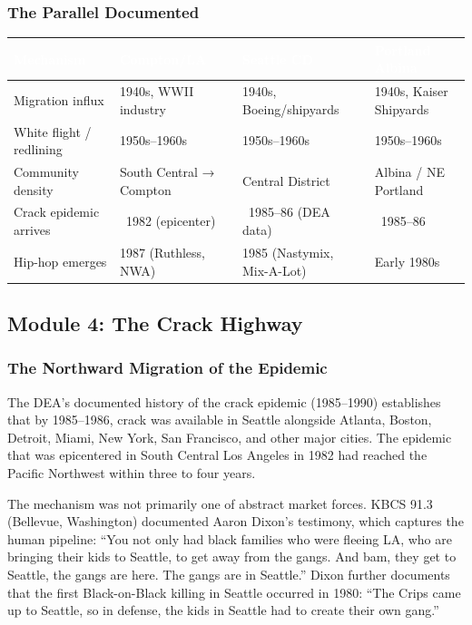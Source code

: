 \documentclass[11pt,letterpaper]{article}
\newcommand{\tableheader}[1]{\textbf{\sffamily\textcolor{white}{#1}}}
\begin{document}
\subsubsection{The Parallel Documented}

\begin{center}
\begin{tabularx}{\textwidth}{L{3cm}L{3.5cm}L{3.5cm}X}
\toprule
{}
\tableheader{Mechanism} & \tableheader{Compton/LA} & \tableheader{Seattle CD} & \tableheader{Portland Albina} \\
\midrule
Migration influx & 1940s, WWII industry & 1940s, Boeing/shipyards & 1940s, Kaiser Shipyards \\
White flight / redlining & 1950s--1960s & 1950s--1960s & 1950s--1960s \\
Community density & South Central → Compton & Central District & Albina / NE Portland \\
Crack epidemic arrives & ~1982 (epicenter) & ~1985--86 (DEA data) & ~1985--86 \\
Hip-hop emerges & 1987 (Ruthless, NWA) & 1985 (Nastymix, Mix-A-Lot) & Early 1980s \\
\bottomrule
\end{tabularx}
\end{center}

\subsection{Module 4: The Crack Highway}

\subsubsection{The Northward Migration of the Epidemic}

The DEA's documented history of the crack epidemic (1985--1990) establishes that by 1985--1986, crack was available in Seattle alongside Atlanta, Boston, Detroit, Miami, New York, San Francisco, and other major cities. The epidemic that was epicentered in South Central Los Angeles in 1982 had reached the Pacific Northwest within three to four years.

The mechanism was not primarily one of abstract market forces. KBCS 91.3 (Bellevue, Washington) documented Aaron Dixon's testimony, which captures the human pipeline: ``You not only had black families who were fleeing LA, who are bringing their kids to Seattle, to get away from the gangs. And bam, they get to Seattle, the gangs are here. The gangs are in Seattle.'' Dixon further documents that the first Black-on-Black killing in Seattle occurred in 1980: ``The Crips came up to Seattle, so in defense, the kids in Seattle had to create their own gang.''
\end{document}
